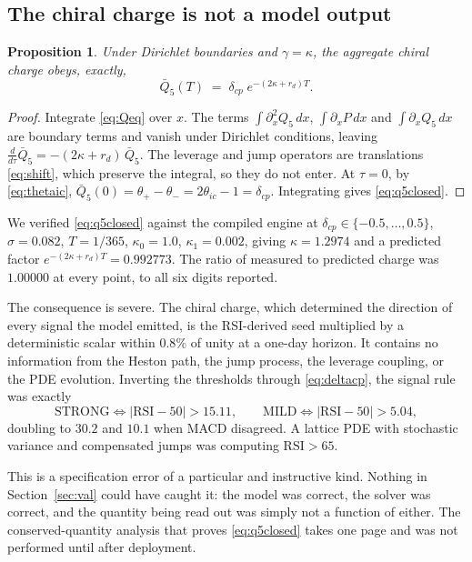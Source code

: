 \documentclass[11pt]{article}
\newtheorem{proposition}{Proposition}
\begin{document}
\subsection{The chiral charge is not a model output}

\begin{proposition}
\label{prop:q5}
Under Dirichlet boundaries and $\gamma = \kappa$, the aggregate chiral
charge obeys, exactly,
\begin{equation}
\bar{Q}_5(T) \;=\; \delta_{cp}\;e^{-(2\kappa + r_d)T}.
\label{eq:q5closed}
\end{equation}
\end{proposition}

\begin{proof}
Integrate \eqref{eq:Qeq} over $x$. The terms
$\int \partial_x^2 Q_5\,dx$, $\int \partial_x P\,dx$ and
$\int \partial_x Q_5\,dx$ are boundary terms and vanish under Dirichlet
conditions, leaving
$\tfrac{d}{d\tau}\bar{Q}_5 = -(2\kappa + r_d)\,\bar{Q}_5$.
The leverage and jump operators are translations \eqref{eq:shift}, which
preserve the integral, so they do not enter. At $\tau = 0$, by
\eqref{eq:thetaic}, $\bar{Q}_5(0) = \theta_+ - \theta_- = 2\theta_{ic} - 1
= \delta_{cp}$. Integrating gives \eqref{eq:q5closed}.
\end{proof}

We verified \eqref{eq:q5closed} against the compiled engine at
$\delta_{cp} \in \{-0.5, \dots, 0.5\}$, $\sigma = 0.082$, $T = 1/365$,
$\kappa_0 = 1.0$, $\kappa_1 = 0.002$, giving
$\kappa = 1.2974$ and a predicted factor $e^{-(2\kappa+r_d)T} = 0.992773$.
The ratio of measured to predicted charge was $1.00000$ at every point, to
all six digits reported.

The consequence is severe. The chiral charge, which determined the
direction of every signal the model emitted, is the RSI-derived seed
multiplied by a deterministic scalar within $0.8\%$ of unity at a one-day
horizon. It contains no information from the Heston path, the jump process,
the leverage coupling, or the PDE evolution. Inverting the thresholds
through \eqref{eq:deltacp}, the signal rule was exactly
\begin{equation}
\text{STRONG} \iff |\mathrm{RSI} - 50| > 15.11,
\qquad
\text{MILD} \iff |\mathrm{RSI} - 50| > 5.04,
\end{equation}
doubling to $30.2$ and $10.1$ when MACD disagreed. A lattice PDE with
stochastic variance and compensated jumps was computing
$\mathrm{RSI} > 65$.

This is a specification error of a particular and instructive kind. Nothing
in Section~\ref{sec:val} could have caught it: the model was correct, the
solver was correct, and the quantity being read out was simply not a
function of either. The conserved-quantity analysis that proves
\eqref{eq:q5closed} takes one page and was not performed until after
deployment.
\end{document}
